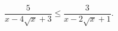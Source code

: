 \begin{ex}[type=inequality]
	\begin{condition}
		$\dfrac{5}{x - 4\sqrt{x} + 3}\leqslant\dfrac{3}{x - 2\sqrt{x} + 1}.$
	\end{condition}
	\answer{$ x \in[0;1)\cup(1;9).$}
\end{ex}